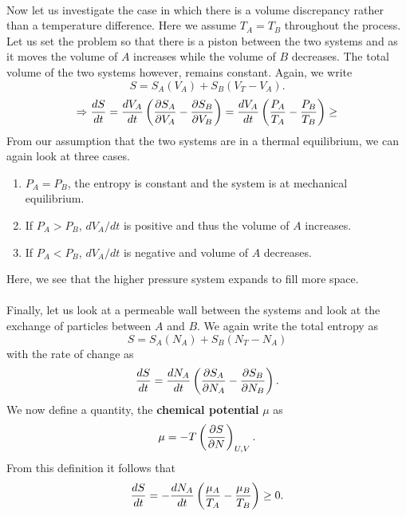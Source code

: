         \\
        Now let us investigate the case in which there is a volume discrepancy rather than a temperature difference. Here we assume $T_A=T_B$ throughout the process. Let us set the problem so that there is a piston between the two systems and as it moves the volume of $A$ increases while the volume of $B$ decreases. The total volume of the two systems however, remains constant. Again, we write
        \begin{equation}
            S = S_A(V_A) + S_B(V_T-V_A).
        \end{equation}
        \begin{equation}
            \Rightarrow \frac{d S}{d t} = \frac{d V_A}{d t}\left( \frac{\partial S_A}{\partial V_A}-\frac{\partial S_B}{\partial V_B} \right) = \frac{d V_A}{d t}\left( \frac{P_A}{T_A}-\frac{P_B}{T_B} \right) \geq
        \end{equation}
\newpage
        From our assumption that the two systems are in a thermal equilibrium, we can again look at three cases.
        \begin{enumerate}
            \item $P_A=P_B$, the entropy is constant and the system is at mechanical equilibrium.
            \item If $P_A>P_B$, $dV_A/dt$ is positive and thus the volume of $A$ increases.
            \item If $P_A<P_B$, $dV_A/dt$ is negative and volume of $A$ decreases.
        \end{enumerate}
        Here, we see that the higher pressure system expands to fill more space. \\
        \\
        Finally, let us look at a permeable wall between the systems and look at the exchange of particles between $A$ and $B$. We again write the total entropy as 
        \begin{equation}
            S = S_A(N_A) + S_B(N_T-N_A)
        \end{equation}
        with the rate of change as
        \begin{equation}
            \frac{d S}{d t} = \frac{d N_A}{d t}\left( \frac{\partial S_A}{\partial N_A}-\frac{\partial S_B}{\partial N_B} \right).
        \end{equation}
        We now define a quantity, the \textbf{chemical potential} $\mu$ as
        \begin{equation}
            \mu = -T\left( \frac{\partial S}{\partial N} \right)_{U,V}.
        \end{equation}
        From this definition it follows that
        \begin{equation}
            \frac{d S}{d t} = -\frac{d N_A}{d t}\left( \frac{\mu_A}{T_A}-\frac{\mu_B}{T_B} \right)\geq 0.
        \end{equation}

